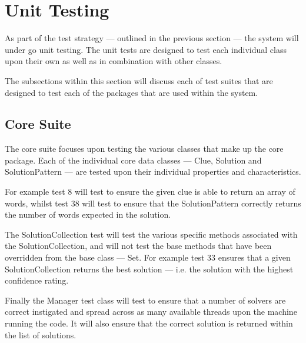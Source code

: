 \section{Unit Testing}
\label{sec:unit_testing}

As part of the test strategy --- outlined in the previous section --- the system
will under go unit testing. The unit tests are designed to test each individual 
class upon their own as well as in combination with other classes.

The subsections within this section will discuss each of test suites that are 
designed to test each of the packages that are used within the system.

\subsection{Core Suite}
\label{sub:test_core_suite}

The core suite focuses upon testing the various classes that make up the core 
package. Each of the individual core data classes --- Clue, Solution and 
SolutionPattern --- are tested upon their individual properties and 
characteristics.

For example test 8 will test to ensure the given clue is able to return an array
of words, whilst test 38 will test to ensure that the SolutionPattern correctly
returns the number of words expected in the solution.

The SolutionCollection test will test the various specific methods associated 
with the SolutionCollection, and will not test the base methods that have been 
overridden from the base class --- Set. For example test 33 ensures that a given
SolutionCollection returns the best solution --- i.e. the solution with the 
highest confidence rating.

Finally the Manager test class will test to ensure that a number of solvers are 
correct instigated and spread across as many available threads upon the machine
running the code. It will also ensure that the correct solution is returned 
within the list of solutions.

